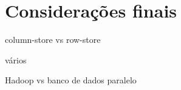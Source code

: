 \section{Considerações finais}

column-store vs row-store \cite{Abadi2008}

vários \cite{Pavlo2009}

Hadoop vs banco de dados paralelo \cite{Stonebraker2010}

